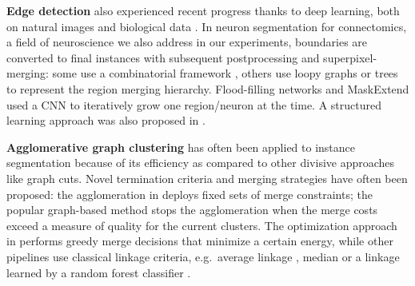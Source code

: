 \textbf{Edge detection} also experienced recent progress thanks to deep learning, both on natural images \cite{Gao_2019_ICCV,liu2018affinity,xie2015holistically,kokkinos2015pushing} and biological data \cite{lee2017superhuman,schmidt2018cell,meirovitch2016multi,ciresan2012deep}. In neuron segmentation for connectomics, a field of neuroscience we also address in our experiments, boundaries are converted to final instances with subsequent postprocessing and superpixel-merging:
some use a combinatorial framework \cite{beier2017multicut}, others use loopy graphs \cite{kaynig2015large,krasowski2015improving} or trees \cite{meirovitch2016multi,liu2016sshmt,liu2014modular,funke2015learning,uzunbas2016efficient} to represent the region merging hierarchy. Flood-filling networks \cite{januszewski2018high} and MaskExtend \cite{meirovitch2016multi} used a CNN to iteratively grow one region/neuron at the time.
A structured learning approach was also proposed in \cite{funke2018large,turaga2009maximin}.

\textbf{Agglomerative graph clustering} has often been applied to instance segmentation \cite{arbelaez2011contour,ren2013image,liu2016image,salembier2000binary} because of its efficiency as compared to other divisive approaches like graph cuts. 
Novel termination criteria and merging strategies have often been proposed: the agglomeration in \cite{malmberg2011generalized} deploys fixed sets of merge constraints; 
the popular graph-based method \cite{felzenszwalb2004efficient} stops the agglomeration when the merge costs exceed a measure of quality for the current clusters. 
The optimization approach in \cite{kiran2014global} performs greedy merge decisions that minimize a certain energy, while other pipelines use classical linkage criteria, e.g.~average linkage \cite{liu2018affinity,lee2017superhuman}, median \cite{funke2018large} or a linkage learned by a random forest classifier \cite{nunez2013machine,knowles2016rhoananet}.


